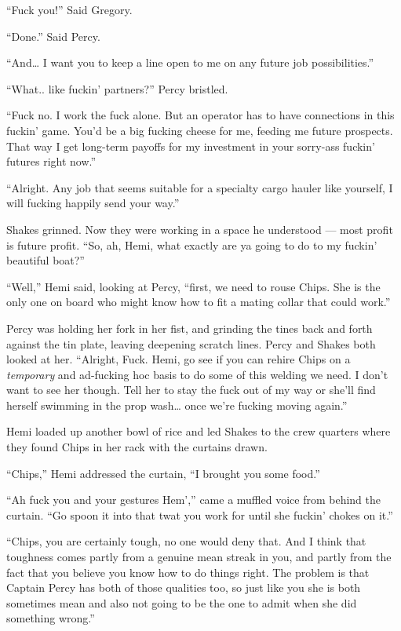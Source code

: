 \documentclass[
]{scrbook}
\begin{document}
``Fuck you!'' Said Gregory.

``Done.'' Said Percy.

``And\ldots{} I want you to keep a line open to me on any future job
possibilities.''

``What.. like fuckin' partners?'' Percy bristled.

``Fuck no. I work the fuck alone. But an operator has to have
connections in this fuckin' game. You'd be a big fucking cheese for me,
feeding me future prospects. That way I get long-term payoffs for my
investment in your sorry-ass fuckin' futures right now.''

``Alright. Any job that seems suitable for a specialty cargo hauler like
yourself, I will fucking happily send your way.''

Shakes grinned. Now they were working in a space he understood --- most
profit is future profit. ``So, ah, Hemi, what exactly are ya going to do
to my fuckin' beautiful boat?''

``Well,'' Hemi said, looking at Percy, ``first, we need to rouse Chips.
She is the only one on board who might know how to fit a mating collar
that could work.''

Percy was holding her fork in her fist, and grinding the tines back and
forth against the tin plate, leaving deepening scratch lines. Percy and
Shakes both looked at her. ``Alright, Fuck. Hemi, go see if you can
rehire Chips on a \emph{temporary} and ad-fucking hoc basis to do some
of this welding we need. I don't want to see her though. Tell her to
stay the fuck out of my way or she'll find herself swimming in the prop
wash\ldots{} once we're fucking moving again.''

Hemi loaded up another bowl of rice and led Shakes to the crew quarters
where they found Chips in her rack with the curtains drawn.

``Chips,'' Hemi addressed the curtain, ``I brought you some food.''

``Ah fuck you and your gestures Hem','' came a muffled voice from behind
the curtain. ``Go spoon it into that twat you work for until she fuckin'
chokes on it.''

``Chips, you are certainly tough, no one would deny that. And I think
that toughness comes partly from a genuine mean streak in you, and
partly from the fact that you believe you know how to do things right.
The problem is that Captain Percy has both of those qualities too, so
just like you she is both sometimes mean and also not going to be the
one to admit when she did something wrong.''
\end{document}
